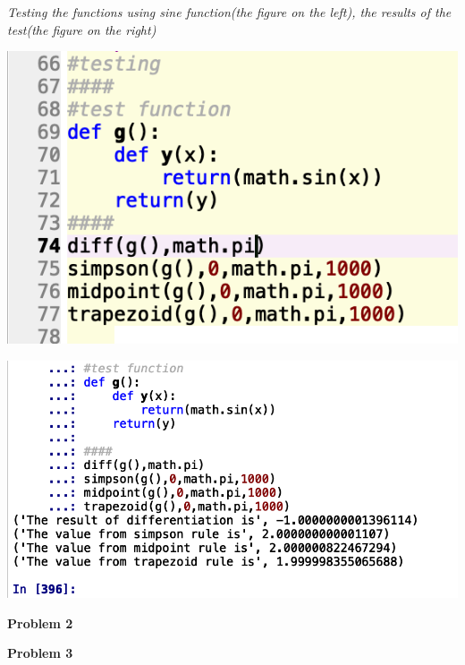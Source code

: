 \documentclass{article}
\begin{document}
\emph{\small{Testing the functions using sine function(the figure on the left), the results of the test(the figure on the right)}}
\begin{center}
\begin{multicols}{2}
	\begin{center}
        \includegraphics[scale=0.5]{Images/pb1test}
        \end{center}
\columnbreak
       \includegraphics[scale=0.37]{Images/pb1testp}
\end{multicols}
\end{center}
\vspace{0.2em}






\vspace{1.5em}
\textbf{Problem 2}\vspace{1.5em}



 
\vspace{1.5em}
\vspace{1.5em}
\textbf{Problem 3}\vspace{1.5em}
\end{document}
